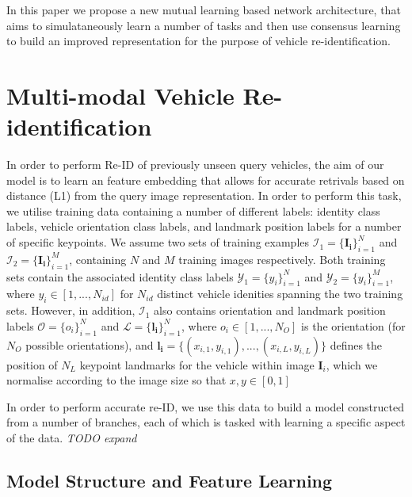 \documentclass[10pt,twocolumn,letterpaper]{article}
\begin{document}
In this paper we propose a new mutual learning based network architecture, that aims to simulataneously learn a number of tasks and then use consensus learning to build an improved representation for the purpose of vehicle re-identification.

\section{Multi-modal Vehicle Re-identification}

In order to perform Re-ID of previously unseen query vehicles, the aim of our model is to learn an feature embedding that allows for accurate retrivals based on distance (\eg L1) from the query image representation. In order to perform this task, we utilise training data containing a number of different labels: identity class labels, vehicle orientation class labels, and landmark position labels for a number of specific keypoints. We assume two sets of training examples $\mathcal{I}_1 = \{\mathbf{I_i}\}_{i=1}^N$ and $\mathcal{I}_2 = \{\mathbf{I_i}\}_{i=1}^M$, containing $N$ and $M$ training images respectively. Both training sets contain the associated identity class labels $\mathcal{Y}_1=\{y_i\}_{i=1}^N$ and $\mathcal{Y}_2=\{y_i\}_{i=1}^M$, where $y_i \in \left[1,...,N_{id}\right]$ for $N_{id}$ distinct vehicle idenities spanning the two training sets. However, in addition, $\mathcal{I}_1$ also contains orientation and landmark position labels $\mathcal{O}=\{o_i\}_{i=1}^N$ and $\mathcal{L}=\{\mathbf{l_i}\}_{i=1}^N$, where $o_i \in \left[1,...,N_O\right]$ is the orientation (for $N_O$ possible orientations), and  $\mathbf{l_i}=\{\left(x_{i,1},y_{i,1}\right),...,\left(x_{i,L},y_{i,L}\right)\}$ defines the position of $N_L$ keypoint landmarks for the vehicle within image $\mathbf{I}_i$, which we normalise according to the image size so that $x,y \in [0,1]$

In order to perform accurate re-ID, we use this data to build a model constructed from a number of branches, each of which is tasked with learning a specific aspect of the data. \emph{TODO expand}

\subsection{Model Structure and Feature Learning}
\end{document}
